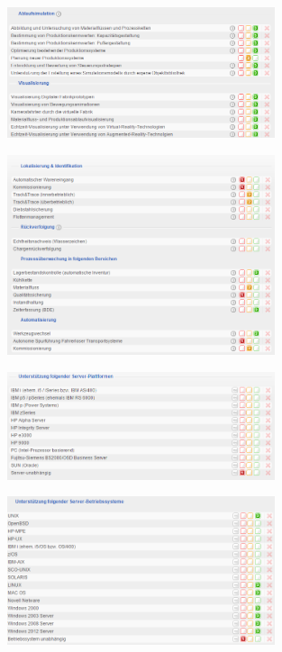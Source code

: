 \documentclass[12pt]{article}
\begin{document}
\noindent
\begin{figure}[here!]
\centering
\includegraphics[width=0.7\textwidth]{images/tr45}
\end{figure}\FloatBarrier
\noindent
\begin{figure}[here!]
\centering
\includegraphics[width=0.7\textwidth]{images/tr46}
\end{figure}\FloatBarrier
\noindent
\begin{figure}[here!]
\centering
\includegraphics[width=0.7\textwidth]{images/tr47}
\end{figure}\FloatBarrier
\noindent
\begin{figure}[here!]
\centering
\includegraphics[width=0.7\textwidth]{images/tr48}
\end{figure}\FloatBarrier
\end{document}
